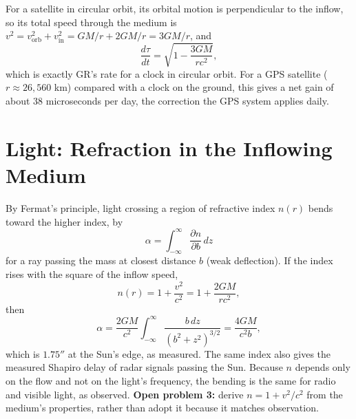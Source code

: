 \documentclass[11pt,a4paper]{article}
\begin{document}
For a satellite in circular orbit, its orbital motion is perpendicular to the inflow, so its total speed through the medium is $v^2 = v_{\text{orb}}^2 + v_{\text{in}}^2 = GM/r + 2GM/r = 3GM/r$, and
\begin{equation}
\frac{d\tau}{dt} = \sqrt{1 - \frac{3GM}{rc^2}},
\end{equation}
which is exactly GR's rate for a clock in circular orbit. For a GPS satellite ($r \approx 26{,}560$ km) compared with a clock on the ground, this gives a net gain of about $38$ microseconds per day, the correction the GPS system applies daily.

\section{Light: Refraction in the Inflowing Medium}
\label{sec:light}
By Fermat's principle, light crossing a region of refractive index $n(r)$ bends toward the higher index, by
\begin{equation}
\alpha = \int_{-\infty}^{\infty} \frac{\partial n}{\partial b}\, dz
\end{equation}
for a ray passing the mass at closest distance $b$ (weak deflection). If the index rises with the square of the inflow speed,
\begin{equation}
n(r) = 1 + \frac{v^2}{c^2} = 1 + \frac{2GM}{rc^2},
\end{equation}
then
\begin{equation}
\alpha = \frac{2GM}{c^2}\int_{-\infty}^{\infty} \frac{b\,dz}{(b^2+z^2)^{3/2}} = \frac{4GM}{c^2 b},
\end{equation}
which is $1.75''$ at the Sun's edge, as measured. The same index also gives the measured Shapiro delay of radar signals passing the Sun. Because $n$ depends only on the flow and not on the light's frequency, the bending is the same for radio and visible light, as observed. \textbf{Open problem 3:} derive $n = 1 + v^2/c^2$ from the medium's properties, rather than adopt it because it matches observation.
\end{document}

